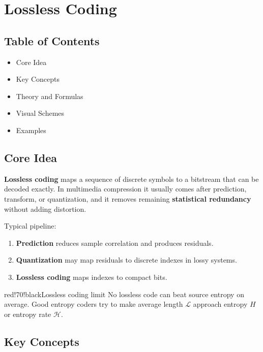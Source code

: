 \chapter{Lossless Coding}

\section{Table of Contents}

\begin{itemize}
  \item Core Idea
  \item Key Concepts
  \item Theory and Formulas
  \item Visual Schemes
  \item Examples
\end{itemize}

\section{Core Idea}

\textbf{Lossless coding} maps a sequence of discrete symbols to a bitstream that can be decoded exactly. In multimedia compression it usually comes after prediction, transform, or quantization, and it removes remaining \textbf{statistical redundancy} without adding distortion.

Typical pipeline:

\begin{enumerate}
  \item \textbf{Prediction} reduces sample correlation and produces residuals.
  \item \textbf{Quantization} may map residuals to discrete indexes in lossy systems.
  \item \textbf{Lossless coding} maps indexes to compact bits.
\end{enumerate}

\begin{calloutbox}{red!70!black}{Lossless coding limit}
No lossless code can beat source entropy on average. Good entropy coders try to make average length $\mathcal{L}$ approach entropy $H$ or entropy rate $\mathcal{H}$.
\end{calloutbox}

\section{Key Concepts}

